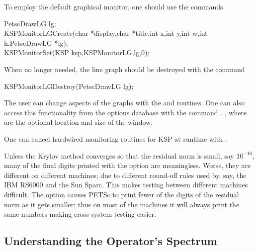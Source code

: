 To employ the default graphical monitor, one should use the 
commands 
\begin{tabbing}
   PetscDrawLG lg;\\
  KSPMonitorLGCreate(char *display,char *title,int x,int y,int w,int h,PetscDrawLG *lg);\\
  KSPMonitorSet(KSP ksp,KSPMonitorLG,lg,0);
\end{tabbing}
When no longer needed, the line graph should be destroyed 
with the command
\begin{tabbing}
  KSPMonitorLGDestroy(PetscDrawLG lg);
\end{tabbing}
The user can change aspects of the graphs with the  and 
 routines.  
One can also access this functionality from the options database 
with the command  \trl{[x,y,w,h]}. , 
where  are the optional location and size of the window.

One can cancel hardwired monitoring routines for KSP at runtime with 
. 

Unless the Krylov method converges so that the residual norm is small,
say $ 10^{-10} $, many of the final digits printed with the 
option are meaningless. Worse, they are different on different 
machines; due to different round-off rules used by, say, the IBM RS6000
and the Sun Sparc. This makes testing between different machines
difficult. The option  
causes PETSc to print fewer of the digits of the residual norm 
as it gets smaller; thus on most of the machines it will always
print the same numbers making cross system testing easier.


\subsection{Understanding the Operator's Spectrum}


